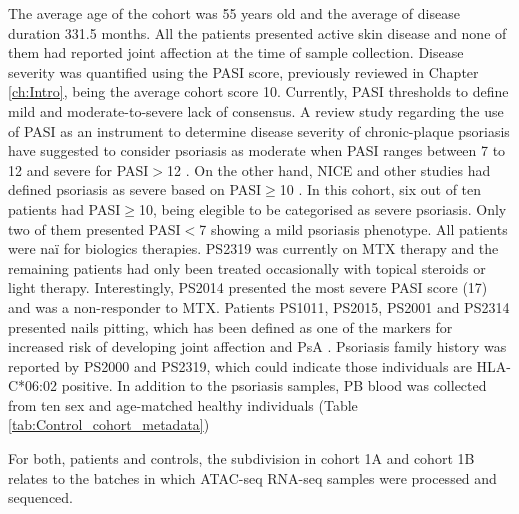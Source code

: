 \bigskip %


The average age of the cohort was 55 years old and the average of disease duration 331.5 months. All the patients presented active skin disease and none of them had reported joint affection at the time of sample collection. Disease severity was quantified using the PASI score, previously reviewed in Chapter \ref{ch:Intro}, being the average cohort score 10. Currently,  PASI thresholds to define mild and moderate-to-severe lack of consensus. A review study regarding the use of PASI as an instrument to determine disease severity of chronic-plaque psoriasis have suggested to consider psoriasis as moderate when PASI ranges between 7 to 12 and severe for PASI$>$12 \parencite{Schmitt2005}. On the other hand, NICE and other studies had defined psoriasis as severe based on PASI$\geq$10 \parencite{Woolacott2006, Finlay2005}. In this cohort, six out of ten patients had PASI$\geq$10, being elegible to be categorised as severe psoriasis. Only two of them presented PASI$<$7 showing a mild psoriasis phenotype. All patients were na\"{i} for biologics therapies. PS2319 was currently on MTX therapy and the remaining patients had only been treated occasionally with topical steroids or light therapy. Interestingly, PS2014 presented the most severe PASI score (17) and was a non-responder to MTX. Patients PS1011, PS2015, PS2001 and PS2314 presented nails pitting, which has been defined as one of the markers for increased risk of developing joint affection and PsA \parencite{Moll1976,Griffiths2007,McGonagle,2011}. Psoriasis family history was reported by PS2000 and PS2319, which could indicate those individuals are HLA-C*06:02 positive. In addition to the psoriasis samples, PB blood was collected from ten sex and age-matched healthy individuals (Table \ref{tab:Control_cohort_metadata})

For both, patients and controls, the subdivision in cohort 1A and cohort 1B relates to the batches in which ATAC-seq RNA-seq samples were processed and sequenced.


